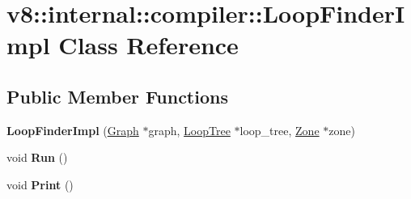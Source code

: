 \hypertarget{classv8_1_1internal_1_1compiler_1_1_loop_finder_impl}{}\section{v8\+:\+:internal\+:\+:compiler\+:\+:Loop\+Finder\+Impl Class Reference}
\label{classv8_1_1internal_1_1compiler_1_1_loop_finder_impl}
\subsection*{Public Member Functions}
\begin{DoxyCompactItemize}
\item 
{\bfseries Loop\+Finder\+Impl} (\hyperlink{classv8_1_1internal_1_1compiler_1_1_graph}{Graph} $\ast$graph, \hyperlink{classv8_1_1internal_1_1compiler_1_1_loop_tree}{Loop\+Tree} $\ast$loop\+\_\+tree, \hyperlink{classv8_1_1internal_1_1_zone}{Zone} $\ast$zone)\hypertarget{classv8_1_1internal_1_1compiler_1_1_loop_finder_impl_a874f05d8bc1c1489d0956a828cd5db94}{}\label{classv8_1_1internal_1_1compiler_1_1_loop_finder_impl_a874f05d8bc1c1489d0956a828cd5db94}

\item 
void {\bfseries Run} ()\hypertarget{classv8_1_1internal_1_1compiler_1_1_loop_finder_impl_a8983753185f157e93228eca1545b8c40}{}\label{classv8_1_1internal_1_1compiler_1_1_loop_finder_impl_a8983753185f157e93228eca1545b8c40}

\item 
void {\bfseries Print} ()\hypertarget{classv8_1_1internal_1_1compiler_1_1_loop_finder_impl_aeb32fc4188f9d6b719fd180ea1350ce3}{}\label{classv8_1_1internal_1_1compiler_1_1_loop_finder_impl_aeb32fc4188f9d6b719fd180ea1350ce3}

\end{DoxyCompactItemize}
